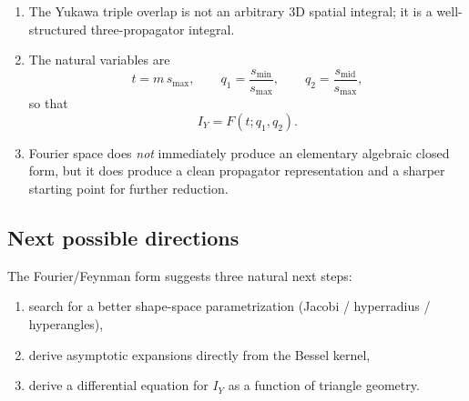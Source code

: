 \begin{enumerate}
\item The Yukawa triple overlap is not an arbitrary 3D spatial integral; it is a well-structured three-propagator integral.
\item The natural variables are
\begin{equation}
t = m\,s_{\max},
\qquad
q_1=\frac{s_{\min}}{s_{\max}},
\qquad
q_2=\frac{s_{\mathrm{mid}}}{s_{\max}},
\end{equation}
so that
\begin{equation}
I_Y = F(t;q_1,q_2).
\end{equation}
\item Fourier space does \emph{not} immediately produce an elementary algebraic closed form, but it does produce a clean propagator representation and a sharper starting point for further reduction.
\end{enumerate}

\subsection{Next possible directions}

The Fourier/Feynman form suggests three natural next steps:

\begin{enumerate}
\item search for a better shape-space parametrization (Jacobi / hyperradius / hyperangles),
\item derive asymptotic expansions directly from the Bessel kernel,
\item derive a differential equation for $I_Y$ as a function of triangle geometry.
\end{enumerate}
